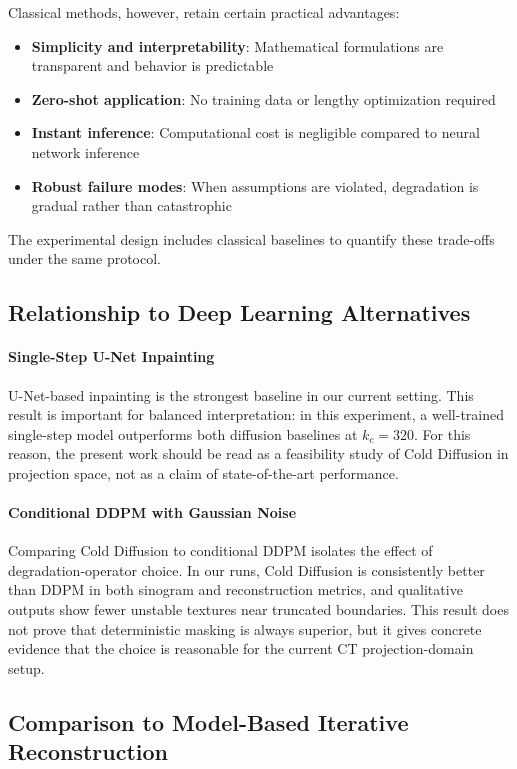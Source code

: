 Classical methods, however, retain certain practical advantages:
\begin{itemize}
    \item \textbf{Simplicity and interpretability}: Mathematical formulations are transparent and behavior is predictable
    \item \textbf{Zero-shot application}: No training data or lengthy optimization required
    \item \textbf{Instant inference}: Computational cost is negligible compared to neural network inference
    \item \textbf{Robust failure modes}: When assumptions are violated, degradation is gradual rather than catastrophic
\end{itemize}

The experimental design includes classical baselines to quantify these trade-offs under the same protocol.

\subsection{Relationship to Deep Learning Alternatives}

\paragraph{Single-Step U-Net Inpainting}
U-Net-based inpainting is the strongest baseline in our current setting. This result is important for balanced interpretation: in this experiment, a well-trained single-step model outperforms both diffusion baselines at \(k_c=320\). For this reason, the present work should be read as a feasibility study of Cold Diffusion in projection space, not as a claim of state-of-the-art performance.

\paragraph{Conditional DDPM with Gaussian Noise}
Comparing Cold Diffusion to conditional DDPM isolates the effect of degradation-operator choice. In our runs, Cold Diffusion is consistently better than DDPM in both sinogram and reconstruction metrics, and qualitative outputs show fewer unstable textures near truncated boundaries. This result does not prove that deterministic masking is always superior, but it gives concrete evidence that the choice is reasonable for the current CT projection-domain setup.

\subsection{Comparison to Model-Based Iterative Reconstruction}

